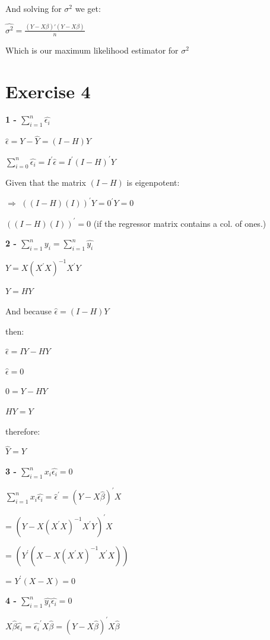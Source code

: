 \documentclass[]{article}
\begin{document}
And solving for \(\sigma^{2}\) we get:

\(\hat{\sigma^{2}} = \frac{(Y - X \beta) \prime (Y - X \beta)}{n}\)

Which is our maximum likelihood estimator for \(\sigma^2\)

\newpage

\hypertarget{exercise-4}{%
\section{Exercise 4}\label{exercise-4}}

\textbf{1 - \(\sum_{i=1}^n \hat{\epsilon_i}\)}

\(\hat{\epsilon} = Y - \hat{Y} = (I-H)Y\)

\(\sum_{i=0}^n \hat{\epsilon_i} = I^{\prime} \hat{\epsilon} = I^{\prime} (I - H)^{\prime} Y\)

Given that the matrix \((I - H)\) is eigenpotent:

\(\Rightarrow\) \(((I-H)(I))^{\prime} Y = 0^{\prime} Y = 0\)

\(((I-H)(I))^{\prime} = 0\) (if the regressor matrix contains a col. of
ones.)

\textbf{2 - \(\sum_{i=1}^n y_i = \sum_{i=1}^n \hat{y_i}\)}

\(Y = X(X^{\prime} X)^{-1} X^{\prime} Y\)

\(Y = HY\)

And because \(\hat{\epsilon} = (I-H)Y\)

then:

\(\hat{\epsilon} = IY - HY\)

\(\hat{\epsilon} = 0\)

\(0 = Y - HY\)

\(HY = Y\)

therefore:

\(\hat{Y} = Y\)

\textbf{3 - \(\sum_{i=1}^n x_i \hat{\epsilon_i} = 0\)}

\(\sum_{i=1}^n x_i \hat{\epsilon_i} = \hat{\epsilon}^{\prime} = (Y-X \hat{\beta})^{\prime} X\)

= \((Y - X(X^{\prime} X)^{-1} X^{\prime} Y)^{\prime} X\)

= \((Y^{\prime} (X - X(X^{\prime} X)^{-1} X^{\prime} X))\)

= \(Y^{\prime} (X-X) = 0\)

\textbf{4 - \(\sum_{i=1}^n \hat{y_i} \hat{\epsilon_i} = 0\)}

\(X \hat{\beta} \hat{\epsilon_i} = \hat{\epsilon_i}^{\prime} X \hat{\beta} = (Y - X \hat{\beta})^{\prime} X \hat{\beta}\)
\end{document}
